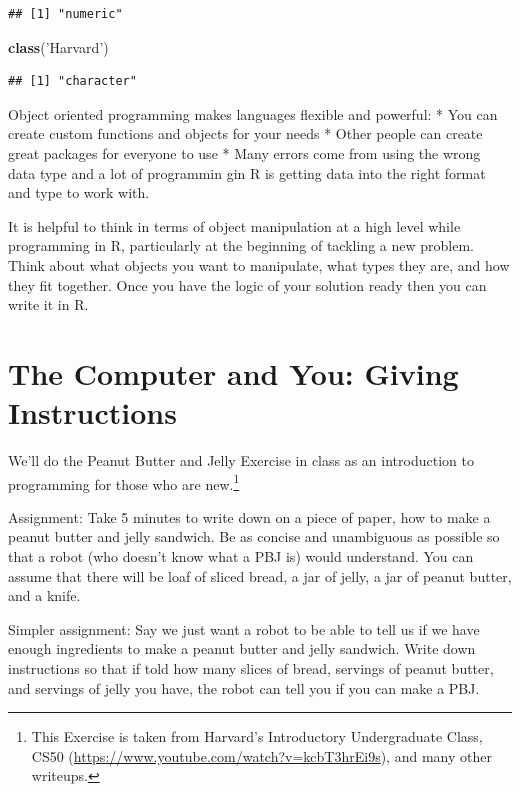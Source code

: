 \documentclass[]{book}
\newenvironment{Shaded}{\begin{snugshade}}{\end{snugshade}}
\newcommand{\KeywordTok}[1]{\textcolor[rgb]{0.13,0.29,0.53}{\textbf{#1}}}
\newcommand{\NormalTok}[1]{#1}
\newcommand{\StringTok}[1]{\textcolor[rgb]{0.31,0.60,0.02}{#1}}
\let\rmarkdownfootnote\footnote%
\def\footnote{\protect\rmarkdownfootnote}
\theoremstyle{definition}
\theoremstyle{definition}
\theoremstyle{definition}
\theoremstyle{remark}
\begin{document}
\begin{verbatim}
## [1] "numeric"
\end{verbatim}

\begin{Shaded}
\begin{Highlighting}[]
\KeywordTok{class}\NormalTok{(}\StringTok{'Harvard'}\NormalTok{)}
\end{Highlighting}
\end{Shaded}

\begin{verbatim}
## [1] "character"
\end{verbatim}

Object oriented programming makes languages flexible and powerful:
* You can create custom functions and objects for your needs
* Other people can create great packages for everyone to use
* Many errors come from using the wrong data type and a lot of programmin gin R is getting data into the right format and type to work with.

It is helpful to think in terms of object manipulation at a high level while programming in R, particularly at the beginning of tackling a new problem. Think about what objects you want to manipulate, what types they are, and how they fit together. Once you have the logic of your solution ready then you can write it in R.

\hypertarget{the-computer-and-you-giving-instructions}{%
\section{The Computer and You: Giving Instructions}\label{the-computer-and-you-giving-instructions}}

We'll do the Peanut Butter and Jelly Exercise in class as an introduction to programming for those who are new.\footnote{This Exercise is taken from Harvard's Introductory Undergraduate Class, CS50 (\url{https://www.youtube.com/watch?v=kcbT3hrEi9s}), and many other writeups.}

Assignment: Take 5 minutes to write down on a piece of paper, how to make a peanut butter and jelly sandwich. Be as concise and unambiguous as possible so that a robot (who doesn't know what a PBJ is) would understand. You can assume that there will be loaf of sliced bread, a jar of jelly, a jar of peanut butter, and a knife.

Simpler assignment: Say we just want a robot to be able to tell us if we have enough ingredients to make a peanut butter and jelly sandwich. Write down instructions so that if told how many slices of bread, servings of peanut butter, and servings of jelly you have, the robot can tell you if you can make a PBJ.
\end{document}
